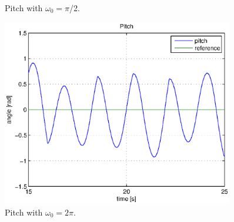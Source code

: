 \begin{figure}[htb]
\begin{minipage}{.5\textwidth}
	    \caption{Pitch with $\omega_0 = \pi$/2.}
        \label{fig:pitch_pi_half}
    \end{minipage}%
    \begin{minipage}{.5\textwidth}
    \centering
		\includegraphics[width=0.9\textwidth]{plots/part2new/pitch_2pi.eps}
	    \caption{Pitch with $\omega_0 = 2 \pi$.}
        \label{fig:pitch_2pi}
    \end{minipage}
    
\end{figure}

%	

